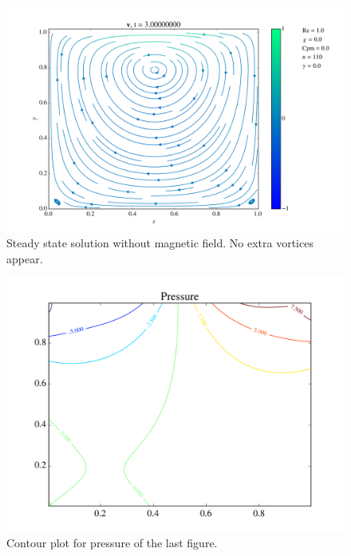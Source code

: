 \documentclass[journal]{IEEEtran}
\begin{document}
\begin{figure}[!t]
\centering
\includegraphics[width=\linewidth]{figures/Re001/n/vectorField}
\caption{Steady state solution without magnetic field. No extra vortices appear.\label{Re001nVectorField}}
\end{figure}

\begin{figure}[!t]
\centering
\includegraphics[width=\linewidth]{figures/Re001/n/pressure}
\caption{Contour plot for pressure of the last figure. \label{Re001nPressure}}
\end{figure}
\end{document}
